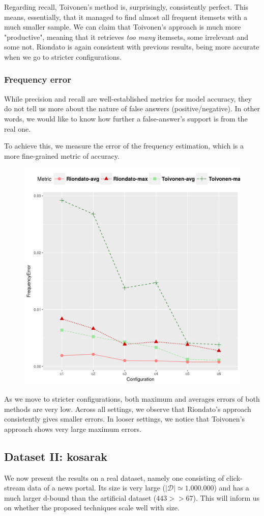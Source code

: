 \documentclass[11pt]{sigplanconf}
\newcommand\D{\mathcal{D}}
\begin{document}
Regarding recall, Toivonen's method is, surprisingly, consistently perfect. This means, essentially, that it managed to find almost all frequent itemsets with a much smaller sample. We can claim that Toivonen's approach is much more "productive", meaning that it retrieves \textit{too many} itemsets, some irrelevant and some not. Riondato is again consistent with previous results, being more accurate when we go to stricter configurations.

\subsubsection{Frequency error}
While precision and recall are well-established metrics for model accuracy, they do not tell us more about the nature of false answers (positive/negative). In other words, we would like to know how further a false-answer's support is from the real one.

To achieve this, we measure the error of the frequency estimation, which is a more fine-grained metric of accuracy.
\begin{figure}[h!]
\centering
\includegraphics[width=.7\columnwidth]{T40I10D100K.dat/freq.png}
\end{figure}
As we move to stricter configurations, both maximum and averages errors of both methods are very low. Across all settings, we observe that Riondato's approach consistently gives smaller errors. In looser settings, we notice that Toivonen's approach shows very large maximum errors.

\subsection{Dataset II: kosarak}
We now present the results on a real dataset, namely one consisting of click-stream data of a news portal. Its size is very large ($|\D| \simeq 1.000.000$) and has a much larger d-bound than the artificial dataset ($443 >> 67$). This will inform us on whether the proposed techniques scale well with size.
\end{document}
